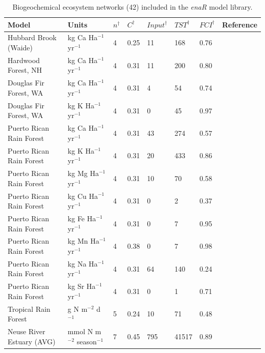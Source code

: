 \documentclass[article]{jss}
\begin{document}
\begin{table}[ht]
\begin{center}
  \caption{Biogeochemical ecosystem networks (42) included in the
    \textit{enaR} model library.} \label{tab:BGC}
  \begin{tiny}
    \begin{tabularx}{\textwidth}{llllllll}
      \hline
      Model & Units & $n^\dagger$ & $C^\dagger$ & $Input^\dagger$ & $TST^\dagger$ & $FCI^\dagger$ & Reference \\
      \hline
      Hubbard Brook (Waide) & kg Ca Ha$^{-1}$  yr$^{-1}$ &   4 & 0.25 &  11 & 168 & 0.76 & \citet{waide74} \\
      Hardwood Forest, NH & kg Ca Ha$^{-1}$  yr$^{-1}$ &   4 & 0.31 &  11 & 200 & 0.80 & \citet{jordan72} \\
      Douglas Fir Forest, WA  & kg Ca Ha$^{-1}$  yr$^{-1}$ &   4 & 0.31 &   4 &  54 & 0.74 & \citet{jordan72} \\
      Douglas Fir Forest, WA  & kg K Ha$^{-1}$  yr$^{-1}$ &   4 & 0.31 &   0 &  45 & 0.97 & \citet{jordan72} \\
      Puerto Rican Rain Forest & kg Ca Ha$^{-1}$  yr$^{-1}$ &   4 & 0.31 &  43 & 274 & 0.57 & \citet{jordan72} \\
      Puerto Rican Rain Forest & kg K Ha$^{-1}$  yr$^{-1}$ &   4 & 0.31 &  20 & 433 & 0.86 & \citet{jordan72} \\
      Puerto Rican Rain Forest & kg Mg Ha$^{-1}$  yr$^{-1}$ &   4 & 0.31 &  10 &  70 & 0.58 & \citet{jordan72} \\
      Puerto Rican Rain Forest & kg Cu Ha$^{-1}$  yr$^{-1}$ &   4 & 0.31 &   0 &   2 & 0.37 & \citet{jordan72} \\
      Puerto Rican Rain Forest & kg Fe Ha$^{-1}$  yr$^{-1}$ &   4 & 0.31 &   0 &   7 & 0.95 & \citet{jordan72} \\
      Puerto Rican Rain Forest & kg Mn Ha$^{-1}$  yr$^{-1}$ &   4 & 0.38 &   0 &   7 & 0.98 & \citet{jordan72} \\
      Puerto Rican Rain Forest & kg Na Ha$^{-1}$  yr$^{-1}$ &   4 & 0.31 &  64 & 140 & 0.24 & \citet{jordan72} \\
      Puerto Rican Rain Forest & kg Sr Ha$^{-1}$  yr$^{-1}$ &   4 & 0.31 &   0 &   1 & 0.71 & \citet{jordan72} \\
      Tropical Rain Forest & g N m$^{-2}$ d$^{-1}$  &   5 & 0.24 &  10 &  71 & 0.48 & \citet{edmisten70} \\
      Neuse River Estuary (AVG) & mmol N m$^{-2}$ season$^{-1}$ &   7 & 0.45 & 795 & 41517 & 0.89 & \citet{christian03} \\

\end{tabularx}
\end{tiny}
\end{center}
\end{table}
\end{document}
